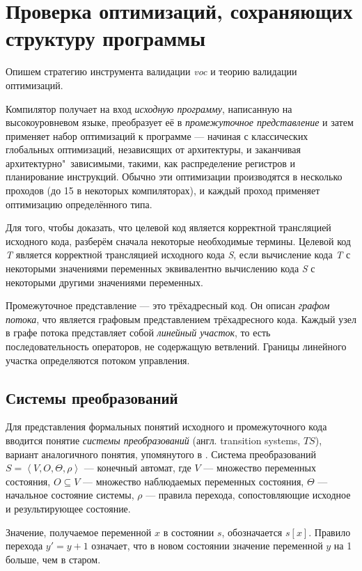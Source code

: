 \section{Проверка оптимизаций, сохраняющих структуру программы}

Опишем стратегию инструмента валидации \emph{voc} \cite{ZPFG02} и теорию валидации оптимизаций.

Компилятор получает на вход \emph{исходную программу}, написанную на высокоуровневом языке, преобразует её в \emph{промежуточное представление} и затем применяет набор оптимизаций к программе --- начиная с классических глобальных оптимизаций, независящих от архитектуры, и заканчивая архитектурно"~зависимыми, такими, как распределение регистров и планирование инструкций. Обычно эти оптимизации производятся в несколько проходов (до 15 в некоторых компиляторах), и каждый проход применяет оптимизацию определённого типа.

Для того, чтобы доказать, что целевой код является корректной трансляцией исходного кода, разберём сначала некоторые необходимые термины. Целевой код \emph{T} является корректной трансляцией исходного кода \emph{S}, если вычисление кода \emph{T} с некоторыми значениями переменных эквивалентно вычислению кода \emph{S} с некоторыми другими значениями переменных.

Промежуточное представление --- это трёхадресный код. Он описан \emph{графом потока}, что является графовым представлением трёхадресного кода. Каждый узел в графе потока представляет собой \emph{линейный участок}, то есть последовательность операторов, не содержащую ветвлений. Границы линейного участка определяются потоком управления.

\subsection{Системы преобразований}

Для представления формальных понятий исходного и промежуточного кода вводится понятие \emph{системы преобразований} (англ. transition systems, $TS$), вариант аналогичного понятия, упомянутого в \cite{PSS98b}. Система преобразований $S = \left\langle  V, O, \Theta, \rho \right\rangle $ --- конечный автомат, где $V$ --- множество переменных состояния, $O \subseteq V$ --- множество наблюдаемых переменных состояния, $\Theta$ --- начальное состояние системы, $\rho$ --- правила перехода, сопостовляющие исходное и результирующее состояние.

Значение, получаемое переменной $x$ в состоянии $s$, обозначается $s[x]$. Правило перехода $y' = y + 1$ означает, что в новом состоянии значение переменной $y$ на 1 больше, чем в старом.


